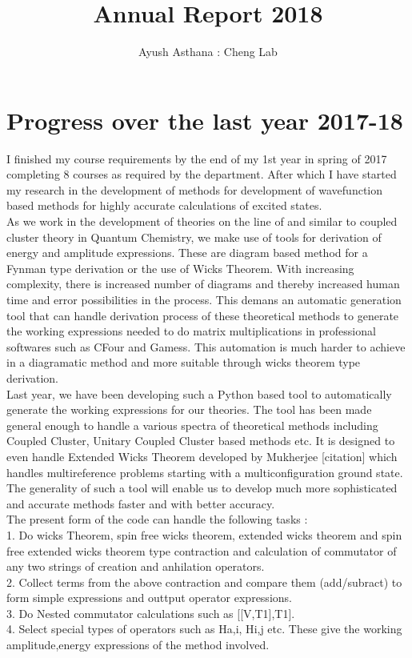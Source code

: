 \documentclass[11pt, oneside]{article}   	%
\title{Annual Report 2018}
\author{Ayush Asthana : Cheng Lab}
\begin{document}
\maketitle

\section{Progress over the last year 2017-18}
I finished my course requirements by the end of my 1st year in spring of 2017 completing 8 courses as required by the department. After which I have started my research in the development of methods for development of wavefunction based methods for highly accurate calculations of excited states. \\

As we work in the development of theories on the line of and similar to coupled cluster theory in Quantum Chemistry, we make use of tools for derivation of energy and amplitude expressions. These are diagram based method for a Fynman type derivation or the use of Wicks Theorem. With increasing complexity, there is increased number of diagrams and thereby increased human time and error possibilities in the process. This demans an automatic generation tool that can handle derivation process of these theoretical methods to generate the working expressions needed to do matrix multiplications in professional softwares such as CFour and Gamess. This automation is much harder to achieve in a diagramatic method and more suitable through wicks theorem type derivation.\\
Last year, we have been developing such a Python based tool to automatically generate the working expressions for our theories. The tool has been made general enough to handle a various spectra of theoretical methods including Coupled Cluster, Unitary Coupled Cluster based methods etc. It is designed to even handle Extended Wicks Theorem developed by Mukherjee [citation] which handles multireference problems starting with a multiconfiguration ground state. The generality of such a tool will enable us to develop much more sophisticated and accurate methods faster and with better accuracy. \\

The present form of the code can handle the following tasks : \\
1. Do wicks Theorem, spin free wicks theorem, extended wicks theorem and spin free extended wicks theorem type contraction and calculation of commutator of any two strings of creation and anhilation operators. \\
2. Collect terms from the above contraction and compare them (add/subract) to form simple expressions and outtput operator expressions.\\
3. Do Nested commutator calculations such as [[V,T1],T1].\\
4. Select special types of operators such as H{a,i}, H{i,j} etc. These give the working amplitude,energy expressions of the method involved. \\
\end{document}
